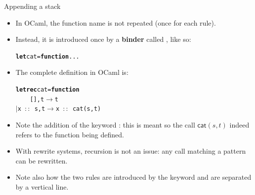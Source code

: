 \documentclass[compress,dvipdfmx]{beamer}
\newcommand{\OCaml}{\textsf{OCaml}\xspace}
\newcommand\fun[1]{\textsf{#1}}
\newcommand\ttcons[2]{{#1}\,$::$\,{#2}}
\begin{document}
%
\begin{frame}[fragile]{Appending a stack}

  \begin{itemize}

    \item In \OCaml, the function name is not repeated (once for each
      rule).

    \item Instead, it is introduced once by a \textbf{binder} called
      \Xlet, like so:
      \vspace*{-3mm}
\begin{alltt}
\small
\textbf{let} cat = \textbf{function} ...
\end{alltt}

     \item The complete definition in \OCaml is:
      \vspace*{-3mm}
\begin{alltt}
\small
\textbf{let} \textbf{rec} cat = \textbf{function}
\ \ \ \ [], t \(\rightarrow\) t
\(\mid\) \ttcons{x}{s}, t \(\rightarrow\) \ttcons{x}{\fun{cat}(s,t)}
\end{alltt}

     \item Note the addition of the keyword \Xrec: this is meant so
       the call \(\fun{cat}(s,t)\) indeed refers to the function being
       defined.

     \item With rewrite systems, recursion is not an issue: any call
       matching a pattern can be rewritten.

     \item Note also how the two rules are introduced by the keyword
       \Xfunction and are separated by a vertical line.
  \end{itemize}

\end{frame}
\end{document}
